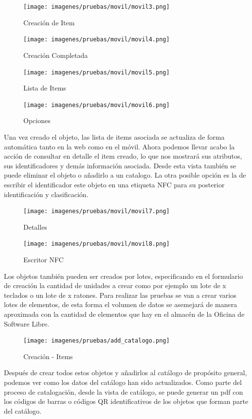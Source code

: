 \documentclass[a4paper,11pt]{book}
\begin{document}
\begin{figure}[H]
  \texttt{[image: imagenes/pruebas/movil/movil3.png]}
  \caption{Creación de Item\cite{propio}}
\endminipage\hfill
{}
  \texttt{[image: imagenes/pruebas/movil/movil4.png]}
  \caption{Creación Completada\cite{propio}}
\endminipage\hfill
\end{figure}

\begin{figure}[H]
  \texttt{[image: imagenes/pruebas/movil/movil5.png]}
  \caption{Lista de Items\cite{propio}}
\endminipage\hfill
{}
  \texttt{[image: imagenes/pruebas/movil/movil6.png]}
  \caption{Opciones\cite{propio}}
\endminipage\hfill
\end{figure}

Una vez creado el objeto, las lista de items asociada se actualiza de forma automática tanto en la web como en el móvil. Ahora podemos llevar acabo la acción  de consultar en detalle el item creado, lo que nos mostrará sus atributos, sus identificadores y demás información asociada. Desde esta vista también se puede eliminar el objeto o añadirlo a un catalogo. La  otra posible opción es la de escribir el identificador este objeto en una etiqueta NFC para su posterior identificación y clasificación.

\begin{figure}[H]
  \texttt{[image: imagenes/pruebas/movil/movil7.png]}
  \caption{Detalles\cite{propio}}
\endminipage\hfill
{}
  \texttt{[image: imagenes/pruebas/movil/movil8.png]}
  \caption{Escritor NFC\cite{propio}}
\endminipage\hfill
\end{figure}

Los objetos también pueden ser creados por lotes, especificando en el formulario de creación la cantidad de unidades a crear como por ejemplo un lote de x teclados o un lote de x ratones. Para realizar las pruebas se van a crear varios lotes de elementos, de esta forma el volumen de datos se asemejará de manera aproximada con la cantidad de elementos que hay en el almacén de la Oficina de Software Libre. 

\begin{figure}[H] 
\centering 
\texttt{[image: imagenes/pruebas/add\_catalogo.png]}
\caption{ Creación - Items\cite{propio}}
\end{figure}

Después de crear todos estos objetos y añadirlos al catálogo de propósito general, podemos ver como los datos del catálogo han sido actualizados. Como parte del proceso de catalogación, desde la vista de catálogo, se puede generar un pdf con los códigos de barras o códigos QR identificativos de los objetos que forman parte del catálogo.  
\end{document}
